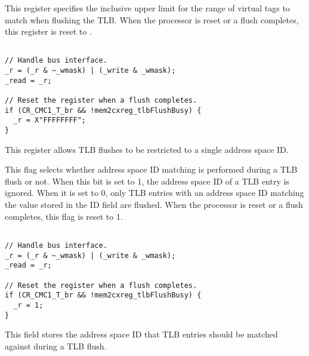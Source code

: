 This register specifies the inclusive upper limit for the range of virtual tags 
to match when flushing the TLB. When the processor is reset or a flush
completes, this register is reset to .

\declaration{}
\implementation{}
\begin{lstlisting}

// Handle bus interface.
_r = (_r & ~_wmask) | (_write & _wmask);
_read = _r;

// Reset the register when a flush completes.
if (CR_CMC1_T_br && !mem2cxreg_tlbFlushBusy) {
  _r = X"FFFFFFFF";
}

\end{lstlisting}


This register allows TLB flushes to be restricted to a single address space ID.

This flag selects whether address space ID matching is performed during a TLB 
flush or not. When this bit is set to 1, the address space ID of a TLB entry is 
ignored. When it is set to 0, only TLB entries with an address space ID matching 
the value stored in the ID field are flushed. When the processor is reset or a
flush completes, this flag is reset to 1.

\declaration{}
\implementation{}
\begin{lstlisting}

// Handle bus interface.
_r = (_r & ~_wmask) | (_write & _wmask);
_read = _r;

// Reset the register when a flush completes.
if (CR_CMC1_T_br && !mem2cxreg_tlbFlushBusy) {
  _r = 1;
}

\end{lstlisting}

This field stores the address space ID that TLB entries should be matched
against during a TLB flush.

